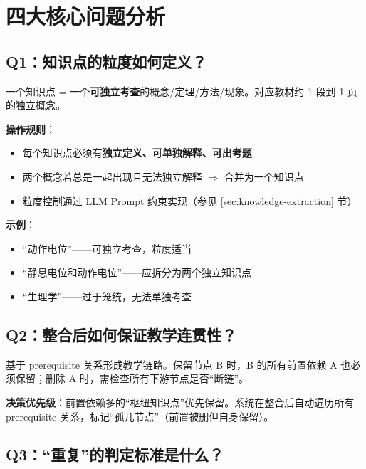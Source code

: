 \documentclass[12pt,a4paper]{article}
\newcommand{\faCheck}{$\checkmark$}
\newcommand{\faTimes}{$\times$}
\begin{document}
\section{四大核心问题分析}
\label{sec:core-questions}

\subsection{Q1：知识点的粒度如何定义？}

\begin{keybox}[知识点粒度定义]
一个知识点 = 一个\textbf{可独立考查}的概念/定理/方法/现象。对应教材约 1 段到 1 页的独立概念。
\end{keybox}

\textbf{操作规则}：
\begin{itemize}[leftmargin=2em]
    \item 每个知识点必须有\textbf{独立定义、可单独解释、可出考题}
    \item 两个概念若总是一起出现且无法独立解释 $\Rightarrow$ 合并为一个知识点
    \item 粒度控制通过 LLM Prompt 约束实现（参见 \ref{sec:knowledge-extraction} 节）
\end{itemize}

\textbf{示例}：
\begin{itemize}[leftmargin=2em]
    \item[\faCheck] ``动作电位''——可独立考查，粒度适当
    \item[\faTimes] ``静息电位和动作电位''——应拆分为两个独立知识点
    \item[\faTimes] ``生理学''——过于笼统，无法单独考查
\end{itemize}

\subsection{Q2：整合后如何保证教学连贯性？}

\begin{keybox}[链路完整性原则]
基于 prerequisite 关系形成教学链路。保留节点 B 时，B 的所有前置依赖 A 也必须保留；删除 A 时，需检查所有下游节点是否``断链''。
\end{keybox}

\textbf{决策优先级}：前置依赖多的``枢纽知识点''优先保留。系统在整合后自动遍历所有 prerequisite 关系，标记``孤儿节点''（前置被删但自身保留）。

\subsection{Q3：``重复''的判定标准是什么？}
\end{document}
